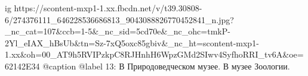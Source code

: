  
 
 
 
 

\ifcmt
  ig https://scontent-mxp1-1.xx.fbcdn.net/v/t39.30808-6/274376111_646228536686813_9043088826770452841_n.jpg?_nc_cat=107&ccb=1-5&_nc_sid=5cd70e&_nc_ohc=tmkP-2Yl_eIAX_hBsUb&tn=Sz-7xQ5oxc85gbiv&_nc_ht=scontent-mxp1-1.xx&oh=00_AT9h5RVIPzkpC8RJHnhH6WpzGMd2SIwv4SyfhoRRI_tv6A&oe=62142E34
  @caption @label 13: В Природоведческом музее. В музее Зоологии.
\fi
